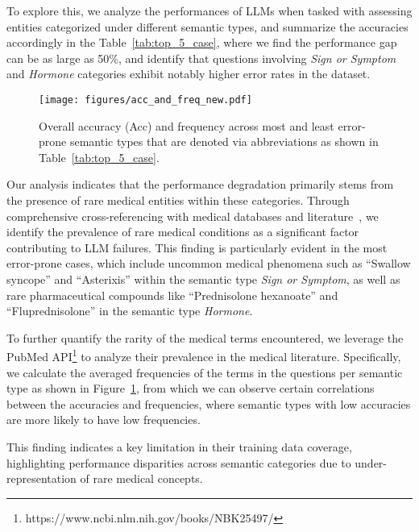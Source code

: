 
\vspace{-1em}

To explore this, we analyze the performances of LLMs when tasked with assessing entities categorized under different semantic types, and summarize the accuracies accordingly in the Table~\ref{tab:top_5_case}, where we find the performance gap can be as large as 50\%, and identify that questions involving \textit{Sign or Symptom} and \textit{Hormone} categories exhibit notably higher error rates in the \mkj dataset.

\begin{figure}[h!]
    \centering
    \texttt{[image: figures/acc\_and\_freq\_new.pdf]}
    \caption{Overall accuracy (Acc) and frequency across most and least error-prone semantic types that are denoted via abbreviations as shown in Table~\ref{tab:top_5_case}.}
    \label{fig:acc_and_freq}
    \vspace{-1em}
\end{figure}





Our analysis indicates that the performance degradation primarily stems from the presence of rare medical entities within these categories. Through comprehensive cross-referencing with medical databases and literature~\cite{chen2024rarebench, wang2024assessing}, we identify the prevalence of rare medical conditions as a significant factor contributing to LLM failures. This finding is particularly evident in the most error-prone cases, which include uncommon medical phenomena such as ``Swallow syncope'' and ``Asterixis'' within the semantic type \textit{Sign or Symptom}, as well as rare pharmaceutical compounds like ``Prednisolone hexanoate'' and ``Fluprednisolone'' in the semantic type \textit{Hormone}.

To further quantify the rarity of the medical terms encountered, we leverage the PubMed API\footnote{https://www.ncbi.nlm.nih.gov/books/NBK25497/} to analyze their prevalence in the medical literature. Specifically, we calculate the averaged frequencies of the terms in the questions per semantic type as shown in Figure~\ref{fig:acc_and_freq}, from which we can observe certain correlations between the accuracies and frequencies, where semantic types with low accuracies are more likely to have low frequencies.


This finding indicates a key limitation in their training data coverage, highlighting performance disparities across semantic categories due to under-representation of rare medical concepts.



